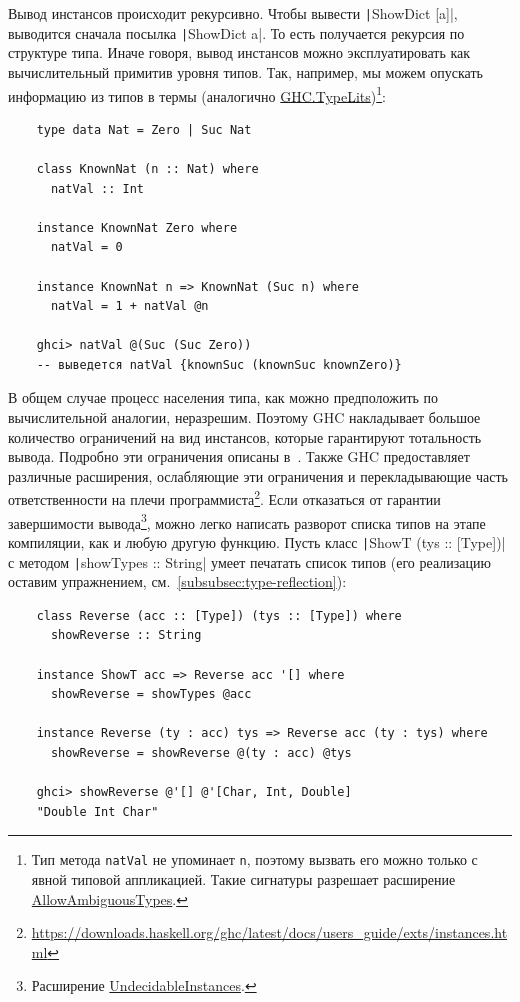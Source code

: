 Вывод инстансов происходит рекурсивно.
Чтобы вывести \texttt|ShowDict [a]|, выводится сначала посылка \texttt|ShowDict a|.
То есть получается рекурсия по структуре типа.
Иначе говоря, вывод инстансов можно эксплуатировать как вычислительный примитив уровня типов.
Так, например, мы можем опускать информацию из типов в термы (аналогично \href{https://hackage.haskell.org/package/base-4.20.0.1/docs/GHC-TypeLits.html}{GHC.TypeLits})\footnote{Тип метода \texttt{natVal} не упоминает \texttt{n}, поэтому вызвать его можно только с явной типовой аппликацией. Такие сигнатуры разрешает расширение \href{https://downloads.haskell.org/ghc/latest/docs/users_guide/exts/ambiguous_types.html}{AllowAmbiguousTypes}.}:
\begin{verbatim}
    type data Nat = Zero | Suc Nat

    class KnownNat (n :: Nat) where
      natVal :: Int

    instance KnownNat Zero where
      natVal = 0

    instance KnownNat n => KnownNat (Suc n) where
      natVal = 1 + natVal @n

    ghci> natVal @(Suc (Suc Zero))
    -- выведется natVal {knownSuc (knownSuc knownZero)}
\end{verbatim}

В общем случае процесс населения типа, как можно предположить по вычислительной аналогии, неразрешим.
Поэтому GHC накладывает большое количество ограничений на вид инстансов, которые гарантируют тотальность вывода.
Подробно эти ограничения описаны в~\cite{sulzmann2007understanding}.
Также GHC предоставляет различные расширения, ослабляющие эти ограничения и перекладывающие часть ответственности на плечи программиста\footnote{\url{https://downloads.haskell.org/ghc/latest/docs/users_guide/exts/instances.html}}.
Если отказаться от гарантии завершимости вывода\footnote{Расширение \href{https://ghc.gitlab.haskell.org/ghc/doc/users_guide/exts/instances.html\#extension-UndecidableInstances}{UndecidableInstances}.}, можно легко написать разворот списка типов на этапе компиляции, как и любую другую функцию.
Пусть класс \texttt|ShowT (tys :: [Type])| с методом \texttt|showTypes :: String| умеет печатать список типов (его реализацию оставим упражнением, см.~\ref{subsubsec:type-reflection}):
\begin{verbatim}
    class Reverse (acc :: [Type]) (tys :: [Type]) where
      showReverse :: String

    instance ShowT acc => Reverse acc '[] where
      showReverse = showTypes @acc

    instance Reverse (ty : acc) tys => Reverse acc (ty : tys) where
      showReverse = showReverse @(ty : acc) @tys

    ghci> showReverse @'[] @'[Char, Int, Double]
    "Double Int Char"
\end{verbatim}

